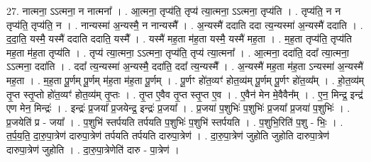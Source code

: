 \documentclass[17pt]{extarticle}
\begin{document}
27. नात्मना॒ ऽऽत्मना॒ न नात्मना᳚ । . आ॒त्मना॒ तृप्य॑ति॒ तृप्य॑ त्या॒त्मना॒ ऽऽत्मना॒ तृप्य॑ति । . तृप्य॑ति॒ न न तृप्य॑ति॒ तृप्य॑ति॒ न । . नान्यस्मा॑ अ॒न्यस्मै॒ न नान्यस्मै᳚ । . अ॒न्यस्मै॑ ददाति ददा त्य॒न्यस्मा॑ अ॒न्यस्मै॑ ददाति । . द॒दा॒ति॒ यस्मै॒ यस्मै॑ ददाति ददाति॒ यस्मै᳚ । . यस्मै॑ मह॒ता म॑ह॒ता यस्मै॒ यस्मै॑ मह॒ता । . म॒ह॒ता तृप्य॑ति॒ तृप्य॑ति मह॒ता म॑ह॒ता तृप्य॑ति । . तृप्य॑ त्या॒त्मना॒ ऽऽत्मना॒ तृप्य॑ति॒ तृप्य॑ त्या॒त्मना᳚ । . आ॒त्मना॒ ददा॑ति॒ ददा᳚ त्या॒त्मना॒ ऽऽत्मना॒ ददा॑ति । . ददा᳚ त्य॒न्यस्मा॑ अ॒न्यस्मै॒ ददा॑ति॒ ददा᳚ त्य॒न्यस्मै᳚ । . अ॒न्यस्मै॑ मह॒ता म॑ह॒ता ऽन्यस्मा॑ अ॒न्यस्मै॑ मह॒ता । . म॒ह॒ता पू॒र्णम् पू॒र्णम् म॑ह॒ता म॑ह॒ता पू॒र्णम् । . पू॒र्णꣳ हो॑त॒व्यꣳ॑ होत॒व्य॑म् पू॒र्णम् पू॒र्णꣳ हो॑त॒व्य᳚म् । . हो॒त॒व्य॑म् तृ॒प्त स्तृ॒प्तो हो॑त॒व्यꣳ॑ होत॒व्य॑म् तृ॒प्तः । . तृ॒प्त ए॒वैव तृ॒प्त स्तृ॒प्त ए॒व । . ए॒वैन॑ मेन मे॒वैवैन᳚म् । . ए॒न॒ मिन्द्र॒ इन्द्र॑ एण मेन॒ मिन्द्रः॑ । . इन्द्रः॑ प्र॒जया᳚ प्र॒जयेन्द्र॒ इन्द्रः॑ प्र॒जया᳚ । . प्र॒जया॑ प॒शुभिः॑ प॒शुभिः॑ प्र॒जया᳚ प्र॒जया॑ प॒शुभिः॑ । . प्र॒जयेति॑ प्र - जया᳚ । . प॒शुभि॑ स्तर्पयति तर्पयति प॒शुभिः॑ प॒शुभि॑ स्तर्पयति । . प॒शुभि॒रिति॑ प॒शु - भिः॒ । . त॒र्प॒य॒ति॒ दा॒रु॒पा॒त्रेण॑ दारुपा॒त्रेण॑ तर्पयति तर्पयति दारुपा॒त्रेण॑ । . दा॒रु॒पा॒त्रेण॑ जुहोति जुहोति दारुपा॒त्रेण॑ दारुपा॒त्रेण॑ जुहोति । . दा॒रु॒पा॒त्रेणेति॑ दारु - पा॒त्रेण॑ । \newline
\end{document}
